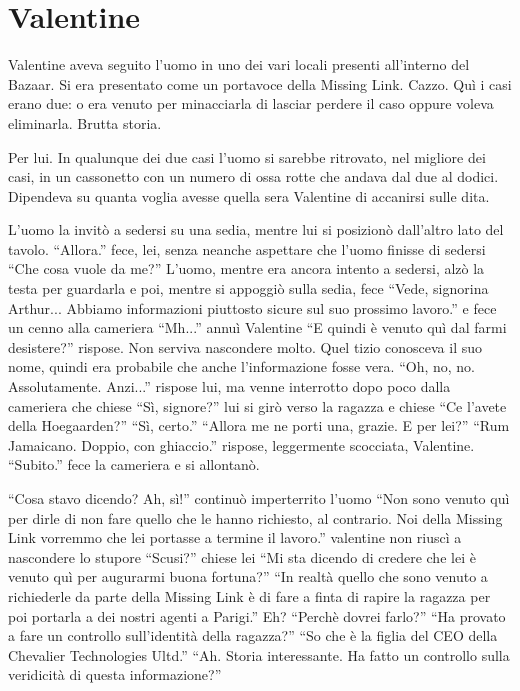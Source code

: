   \section*{Valentine}

    Valentine aveva seguito l'uomo in uno dei vari locali presenti all'interno del Bazaar. Si era presentato come un
    portavoce della Missing Link. Cazzo. Quì i casi erano due: o era venuto per minacciarla di lasciar perdere il caso
    oppure voleva eliminarla. Brutta storia.

    Per lui. In qualunque dei due casi l'uomo si sarebbe ritrovato, nel migliore dei casi, in un cassonetto con un
    numero di ossa rotte che andava dal due al dodici. Dipendeva su quanta voglia avesse quella sera Valentine di
    accanirsi sulle dita.

    L'uomo la invitò a sedersi su una sedia, mentre lui si posizionò dall'altro lato del tavolo. ``Allora.'' fece, lei,
    senza neanche aspettare che l'uomo finisse di sedersi ``Che cosa vuole da me?'' L'uomo, mentre era ancora intento a
    sedersi, alzò la testa per guardarla e poi, mentre si appoggiò sulla sedia, fece ``Vede, signorina Arthur... Abbiamo
    informazioni piuttosto sicure sul suo prossimo lavoro.'' e fece un cenno alla cameriera ``Mh...'' annuì Valentine
    ``E quindi è venuto quì dal farmi desistere?'' rispose. Non serviva nascondere molto. Quel tizio conosceva il suo
    nome, quindi era probabile che anche l'informazione fosse vera. ``Oh, no, no. Assolutamente. Anzi...'' rispose lui,
    ma venne interrotto dopo poco dalla cameriera che chiese ``Sì, signore?'' lui si girò verso la ragazza e chiese ``Ce
    l'avete della Hoegaarden?'' ``Sì, certo.'' ``Allora me ne porti una, grazie. E per lei?'' ``Rum Jamaicano. Doppio,
    con ghiaccio.'' rispose, leggermente scocciata, Valentine. ``Subito.'' fece la cameriera e si allontanò.

    ``Cosa stavo dicendo? Ah, sì!'' continuò imperterrito l'uomo ``Non sono venuto quì per dirle di non fare quello che
    le hanno richiesto, al contrario. Noi della Missing Link vorremmo che lei portasse a termine il lavoro.'' valentine
    non riuscì a nascondere lo stupore ``Scusi?'' chiese lei ``Mi sta dicendo di credere che lei è venuto quì per augurarmi buona
    fortuna?'' ``In realtà quello che sono venuto a richiederle da parte della Missing Link è di fare a finta di rapire
    la ragazza per poi portarla a dei nostri agenti a Parigi.'' Eh? ``Perchè dovrei farlo?'' ``Ha provato a fare un
    controllo sull'identità della ragazza?'' ``So che è la figlia del CEO della Chevalier Technologies Ultd.'' ``Ah.
    Storia interessante. Ha fatto un controllo sulla veridicità di questa informazione?''

